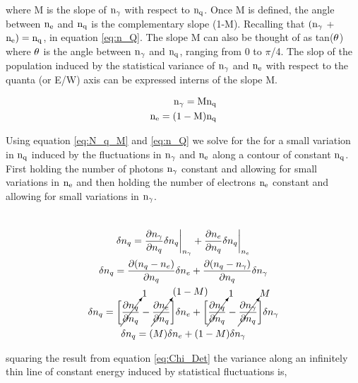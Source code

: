 \noindent where M is the slope of $\rm n_\gamma$ with respect to $\rm n_q$. Once M is defined, the angle between $\rm n_e$ and $\rm n_q$ is the complementary slope (1-M). Recalling that $\rm (n_\gamma$ + $\rm n_e) = n_q$, in equation \ref{eq:n_Q}.  The slope M can also be thought of as tan($\rm \theta$) where $\rm \theta$ is the angle between $\rm n_\gamma$ and $\rm n_q$, ranging from 0 to $\pi$/4. The slop of the population induced by the statistical variance of $\rm n_\gamma$ and $\rm n_e$ with respect to the quanta (or E/W) axis can be expressed interns of the slope M.

\begin{equation}
\begin{split}
\rm n_\gamma = M n_q \\
\rm n_e = (1-M) n_q \\
\label{eq:N_q_M}
\end{split}
\end{equation}

\noindent Using equation \ref{eq:N_q_M} and \ref{eq:n_Q} we solve for the for a small variation in $\rm n_q$ induced by the fluctuations in $\rm n_\gamma$ and $\rm n_e$ along a contour of constant $\rm n_q$. First holding the number of photons $\rm n_\gamma$ constant and allowing for small variations in $\rm n_e$ and then holding the number of electrons $\rm n_e$ constant and allowing for small variations in $\rm n_\gamma$.

\begin{multline}\\
\delta n_q = \frac{\partial n_\gamma}{\partial n_q} \delta n_q \bigg|_{n_{\gamma}} + \frac{\partial n_e}{\partial n_q} \delta n_q \bigg|_{n_{e}} \\
\delta n_q = \frac{\partial (n_q-n_e)}{\partial n_q} \delta n_e + \frac{\partial (n_q-n_\gamma)}{\partial n_q} \delta n_\gamma \\
\delta n_q = \bigg[\cancelto{\tiny{1}}{\frac{\partial n_q}{\partial n_q}}-\cancelto{\tiny{(1-M)}}{\frac{\partial n_e}{\partial n_q}}\bigg] \delta n_e + \bigg[\cancelto{\tiny{1}}{\frac{\partial n_q}{\partial n_q}}-\cancelto{\tiny{M}}{\frac{\partial n_\gamma}{\partial n_q}}\bigg] \delta n_\gamma  \\
\delta n_q = (M) \delta n_e + (1-M) \delta n_\gamma \\
\label{eq:Chi_Det}
\end{multline}

\noindent squaring the result from equation \ref{eq:Chi_Det} the variance along an infinitely thin line of constant energy induced by statistical fluctuations is,


